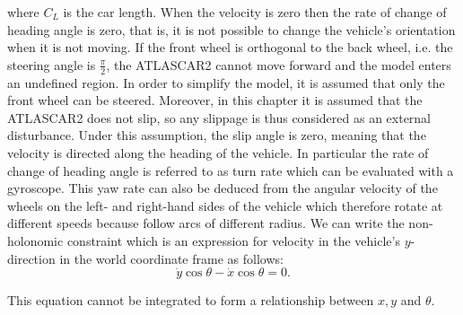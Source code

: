 where $C_L$ is the car length. When the velocity is zero then the rate of change of heading angle is zero, that is, it is not possible to change the vehicle's orientation
when it is not moving. If the front wheel is orthogonal to the back wheel, i.e. the steering angle is $\frac{\pi}{2}$, the ATLASCAR2 cannot move forward and the model enters an undefined region. In order to simplify the model, it is assumed that only the front wheel can be steered. Moreover, in this chapter it is assumed that the ATLASCAR2 does not slip, so any slippage is thus considered as an external disturbance. Under this assumption, the slip angle is zero, meaning that the velocity is directed along the heading of the vehicle. In particular the rate of change of heading angle is referred to as turn rate which can be evaluated with a gyroscope. This yaw rate can also be deduced from the angular velocity of the wheels on the left- and right-hand sides of the vehicle which therefore rotate at different speeds because follow arcs of different radius. We can write the non-holonomic constraint which is an expression for velocity in the vehicle's $y$-direction in the world coordinate frame as follows:
\begin{equation}
	\dot{y}\cos\theta-\dot{x}\cos\theta=0.
\end{equation}

This equation cannot be integrated to form a
relationship between $x,y$ and $\theta$.



